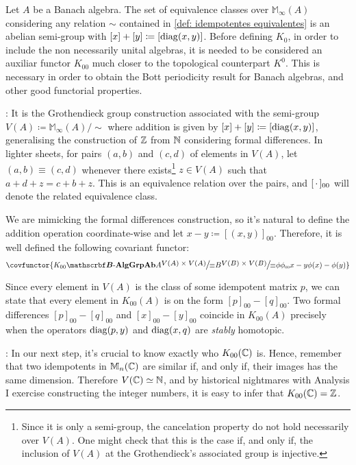 \begin{definicao}
Let $A$ be a Banach algebra. The set of equivalence classes over $\mathbb M_\infty(A)$ considering any relation $\sim$ contained in \ref{def: idempotentes equivalentes} is an abelian semi-group with $[x]+[y] \coloneqq [\operatorname{diag}(x,y)]$. Before defining $K_0$, in order to include the non necessarily unital algebras, it is needed to be considered an auxiliar functor $K_{00}$ much closer to the topological counterpart $K^0$. This is necessary in order to obtain the Bott periodicity result for Banach algebras, and other good functorial properties.

\begin{itroman}
\item \textbf{}: It is the Grothendieck group construction associated with the semi-group $V({A}) \coloneqq \mathbb M_\infty\left({A}\right)/{\sim}$ where addition is given by $[x]+ [y] \coloneqq [\operatorname{diag}(x,y)]$, generalising the construction of $\operatorname{\mathbb{Z}}$ from $\operatorname{\mathbb{N}}$ considering formal differences. In lighter sheets, for pairs $(a,b)$ and $(c,d)$ of elements in $V(A)$, let $(a,b) \equiv (c,d)$ whenever there exists\footnote{Since it is only a semi-group, the cancelation property do not hold necessarily over $V(A)$. One might check that this is the case if, and only if, the inclusion of $V(A)$ at the Grothendieck's associated group is injective.} $z \in V(A)$ such that $a+d+z = c+b+z$. This is an equivalence relation over the pairs, and $[\operatorname{\,\cdot\,}]_{00}$ will denote the related equivalence class. 

We are mimicking the formal differences construction, so it's natural to define the addition operation coordinate-wise and let $x-y \coloneqq [(x,y)]_{00}$. Therefore, it is well defined the following covariant functor:
\begin{equation*}
    \covfunctor{{K_{00}}{\BAlg}{\Ab{\Grp}}{A}{\mfrac{V(A)\times V(A)}{\equiv}}{B}{\mfrac{V(B)\times V(B)}{\equiv}}{\phi}{\sub\phi{00}}{x-y}{\phi(x)-\phi(y)}}
\end{equation*}

Since every element in $V(A)$ is the class of some idempotent matrix $p$, we can state that every element in $K_{00}(A)$ is on the form $[p]_{00} - [q]_{00}$. Two formal differences $[p]_{00}-[q]_{00}$ and $[x]_{00}-[y]_{00}$ coincide in $K_{00}(A)$ precisely when the operators $\operatorname{diag}(p,y)$ and $\operatorname{diag}(x,q)$ are \textit{stably} homotopic. 
\item \textbf{}: In our next step, it's crucial to know exactly who $K_{00}(\operatorname{\mathbb{C}})$ is. Hence, remember that two idempotents in $\mathbb M_n(\operatorname{\mathbb{C}})$ are similar if, and only if, their images has the same dimension. Therefore $V(\operatorname{\mathbb{C}}) \simeq \operatorname{\mathbb{N}}$, and by historical nightmares with Analysis I exercise constructing the integer numbers, it is easy to infer that $K_{00}(\operatorname{\mathbb{C}}) = \operatorname{\mathbb{Z}}$. 


\end{itroman}
\end{definicao}
